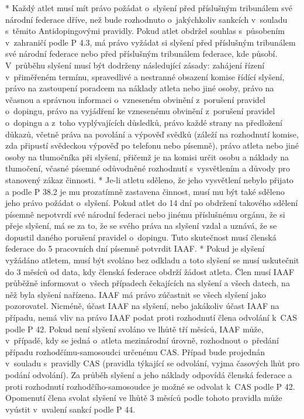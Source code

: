* Každý atlet musí mít právo požádat o~slyšení před příslušným tribunálem své národní federace dříve, než bude rozhodnuto o~jakýchkoliv sankcích v~souladu s~těmito Antidopingovými pravidly. Pokud atlet obdržel souhlas s~působením v~zahraničí podle P 4.3, má právo vyžádat si slyšení před příslušným tribunálem své národní federace nebo před příslušným tribunálem federace, kde působí. V~průběhu slyšení musí být dodrženy následující zásady: zahájení řízení v~přiměřeném termínu, spravedlivé a nestranné obsazení komise řídící slyšení, právo na zastoupení poradcem na náklady atleta nebo jiné osoby, právo na včasnou a správnou informaci o~vzneseném obvinění z~porušení pravidel o~dopingu, právo na vyjádření ke vznesenému obvinění z~porušení pravidel o~dopingu a z~toho vyplývajících důsledků, právo každé strany na předložení důkazů, včetně práva na povolání a výpověď svědků (záleží na rozhodnutí komise, zda připustí svědeckou výpověď po telefonu nebo písemně), právo atleta nebo jiné osoby na tlumočníka při slyšení, přičemž je na komisi určit osobu a náklady na tlumočení, včasné písemné odůvodněné rozhodnutí s~vysvětlením a důvody pro stanovený zákaz činnosti.
* Je-li atletu sděleno, že jeho vysvětlení nebylo přijato a podle P 38.2 je mu prozatímně zastavena činnost, musí mu být také sděleno jeho právo požádat o~slyšení. Pokud atlet do 14 dní po obdržení takového sdělení písemně nepotvrdí své národní federaci nebo jinému příslušnému orgánu, že si přeje slyšení, má se za to, že se svého práva na slyšení vzdal a uznává, že se dopustil daného porušení pravidel o~dopingu. Tuto skutečnost musí členská federace do 5 pracovních dní písemně potvrdit IAAF.
* Pokud je slyšení vyžádáno atletem, musí být svoláno bez odkladu a toto slyšení se musí uskutečnit do 3 měsíců od data, kdy členská federace obdrží žádost atleta. Člen musí IAAF průběžně informovat o~všech případech čekajících na slyšení a všech datech, na něž byla slyšení nařízena. IAAF má právo zúčastnit se všech slyšení jako pozorovatel. Nicméně, účast IAAF na slyšení, nebo jakákoliv účast IAAF na případu, nemá vliv na právo IAAF podat proti rozhodnutí člena odvolání k~CAS podle P 42. Pokud není slyšení svoláno ve lhůtě tří měsíců, IAAF může, v~případě, kdy se jedná o~atleta mezinárodní úrovně, rozhodnout o~předání případu rozhodčímu-samosoudci určenému CAS. Případ bude projednán v~souladu s~pravidly CAS (pravidla týkající se odvolání, vyjma časových lhůt pro podání odvolání). Za průběh slyšení a jeho náklady odpovídá členská federace a proti rozhodnutí rozhodčího-samosoudce je možné se odvolat k~CAS podle P 42. Opomenutí člena svolat slyšení ve lhůtě 3 měsíců podle tohoto pravidla může vyústit v~uvalení sankcí podle P 44.
